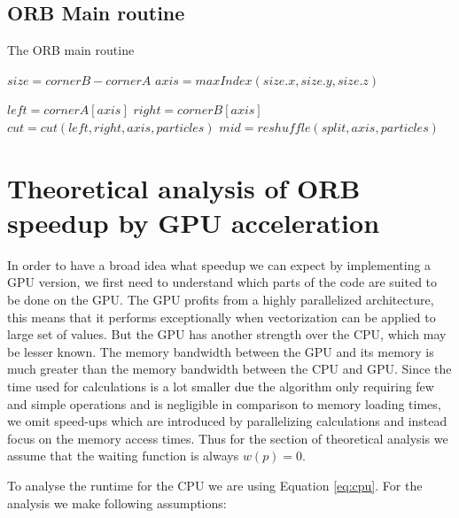 \documentclass[]{article}
\begin{document}
\subsection{ORB Main routine}

\begin{algorithm}[H]
	\caption{The ORB main routine}\label{euclid}
	\begin{algorithmic}[1]
		\State $size = cornerB - cornerA$
		\State $axis = maxIndex(size.x, size.y, size.z)$ 
		
		\State $left = cornerA[axis]$
		\State $right = cornerB[axis]$
		\newline
		\State $cut = cut(left, right, axis, particles)$
		\State $mid = reshuffle(split, axis, particles)$
		\newline
		
		\State {}
		\EndProcedure
	\end{algorithmic}
\end{algorithm}


\vspace{5mm}


\section{Theoretical analysis of ORB speedup by GPU acceleration}

In order to have a broad idea what speedup we can expect by implementing a GPU version, we first need to understand which parts of the code are suited to be done on the GPU. The GPU profits from a highly parallelized architecture, this means that it performs exceptionally when vectorization can be applied to large set of values. But the GPU has another strength over the CPU, which may be lesser known. The memory bandwidth between the GPU and its memory is much greater than the memory bandwidth between the CPU and GPU. Since the time used for calculations is a lot smaller due the algorithm only requiring few and simple operations and is negligible in comparison to memory loading times, we omit speed-ups which are introduced by parallelizing calculations and instead focus on the memory access times. Thus for the section of theoretical analysis we assume that the waiting function is always $w(p) = 0$.

To analyse the runtime for the CPU we are using Equation \ref{eq:cpu}. For the analysis we make following assumptions:
\end{document}
